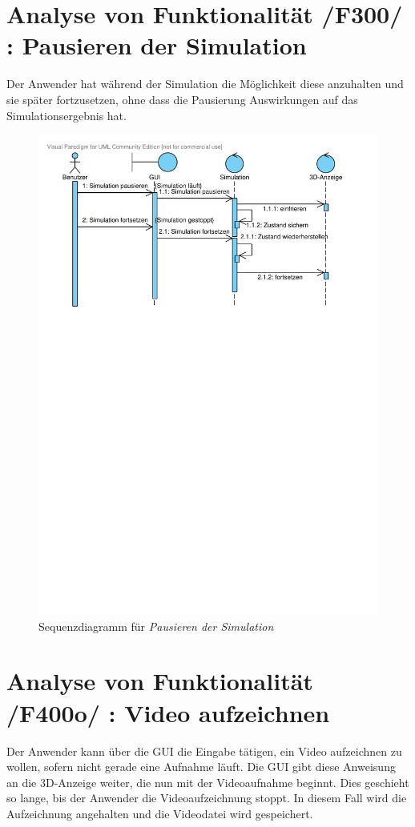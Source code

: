 \section{Analyse von Funktionalität /F300/ :  Pausieren der Simulation}
Der Anwender hat während der Simulation die Möglichkeit diese anzuhalten und sie später fortzusetzen, ohne dass die Pausierung Auswirkungen auf das Simulationsergebnis hat.
\begin{figure}[!h]
\includegraphics[viewport = 0 17.5cm 25cm 30cm, width=\linewidth]{bilder/Pausieren.pdf}
\caption{Sequenzdiagramm für \textit{Pausieren der Simulation}}
\end{figure}

\section{Analyse von Funktionalität /F400o/ :  Video aufzeichnen}
Der Anwender kann über die GUI die Eingabe tätigen, ein Video aufzeichnen zu wollen, sofern nicht gerade eine Aufnahme läuft. Die GUI gibt diese Anweisung an die 3D-Anzeige weiter, die nun mit der
Videoaufnahme beginnt. Dies geschieht so lange, bis der Anwender die Videoaufzeichnung stoppt. In diesem Fall wird die Aufzeichnung angehalten und die Videodatei wird gespeichert.

